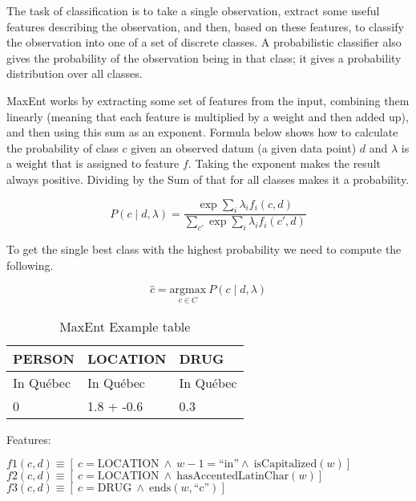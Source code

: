 The task of classification is to take a single observation, extract some useful features describing the observation, and then, based on these features, to classify the observation into one of a set of discrete classes. A probabilistic classifier also gives the probability of the observation being in that class; it gives a probability distribution over all classes.

MaxEnt works by extracting some set of features from the input, combining them linearly (meaning that each feature is multiplied by a weight and then added up), and then using this sum as an exponent.
Formula below shows how to calculate the probability of class $c$ given an observed datum (a given data point) $d$ and $\lambda$ is a weight that is assigned to feature $f$. Taking the exponent makes the result always positive. Dividing by the Sum of that for all classes makes it a probability.

\begin{equation}
  P(c \mid d, \lambda) = \frac{\exp\sum_i\lambda_i f_i (c,d)}
  {\sum_{c\prime}\exp\sum_{i}\lambda_i f_i (c\prime,d)}
  \label{eq:pcdlambda}
\end{equation}

To get the single best class with the highest probability we need to compute the following.

\begin{equation}
  \hat{c} = \underset{c\in C}{\text{argmax}} \ P(c \mid d,\lambda)
  \label{eq:hatc}
\end{equation}

\begin{table}[htb]
  \centering
  \begin{tabu}{lll}
  \toprule
  PERSON    & LOCATION   & DRUG      \\ \midrule
  In Québec & In Québec  & In Québec \\
  0         & 1.8 + -0.6 & 0.3       \\
  \bottomrule
  \end{tabu}
\caption[MaxEnt Example table]{MaxEnt Example table}
\label{tab:maxent}
\end{table}

Features:

$f1(c,d) \equiv [ \ c = \text{LOCATION} \ \wedge \ w-1 = \text{``in''} \wedge \ \text{isCapitalized}(w)]$\\
$f2(c,d) \equiv [ \ c = \text{LOCATION} \ \wedge \ \text{hasAccentedLatinChar}(w)]$\\
$f3(c,d) \equiv [ \ c = \text{DRUG} \ \wedge \ \text{ends}(w,\text{``c''})]$

